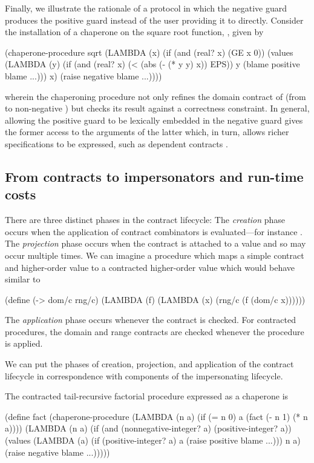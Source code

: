 Finally, we illustrate the rationale of a protocol in which the negative guard produces the positive guard instead of the user providing it to  directly.
Consider the installation of a chaperone on the square root function, , given by
\begin{schemedisplay}
(chaperone-procedure
 sqrt
 (LAMBDA (x)
   (if (and (real? x) (GE x 0))
       (values (LAMBDA (y)
                 (if (and (real? x) (< (abs (- (* y y) x)) EPS))
                     y
                     (blame positive blame ...)))
               x)
       (raise negative blame ...))))
\end{schemedisplay}
wherein the chaperoning procedure not only refines the domain contract of  (from  to non-negative ) but checks its result against a correctness constraint.
In general, allowing the positive guard to be lexically embedded in the negative guard gives the former access to the arguments of the latter which, in turn, allows richer specifications to be expressed, such as dependent contracts \cite{findler2002contracts}.

\subsection{From contracts to impersonators and run-time costs}

There are three distinct phases in the contract lifecycle:
The \emph{creation} phase occurs when the application of contract combinators is evaluated---for instance .
The \emph{projection} phase occurs when the contract is attached to a value and so may occur multiple times.
We can imagine a procedure which maps a simple contract and higher-order value to a contracted higher-order value which would behave similar to
\begin{schemedisplay}
(define (-> dom/c rng/c)
  (LAMBDA (f)
    (LAMBDA (x)
      (rng/c (f (dom/c x))))))
\end{schemedisplay}
The \emph{application} phase occurs whenever the contract is checked.
For contracted procedures, the domain and range contracts are checked whenever the procedure is applied.

We can put the phases of creation, projection, and application of the contract lifecycle in correspondence with components of the impersonating lifecycle.

The contracted tail-recursive factorial procedure expressed as a chaperone is
\begin{schemedisplay}
(define fact (chaperone-procedure
              (LAMBDA (n a)
                (if (= n 0)
                    a
                    (fact (- n 1) (* n a))))
              (LAMBDA (n a)
                (if (and (nonnegative-integer? a)
                         (positive-integer? a))
                    (values (LAMBDA (a)
                              (if (positive-integer? a)
                                  a
                                  (raise positive blame ...)))
                            n a)
                    (raise negative blame ...)))))
\end{schemedisplay}

